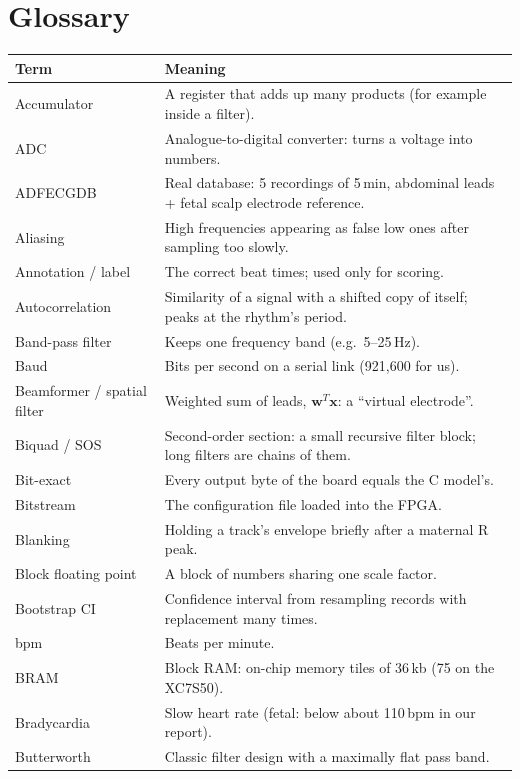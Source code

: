 \documentclass[11pt]{article}
\begin{document}
\section{Glossary}
\label{sec:glossary}
{\small
\begin{longtable}{@{}p{3.4cm} p{12.0cm}@{}}
\toprule
\textbf{Term} & \textbf{Meaning} \\
\midrule
\endhead
Accumulator & A register that adds up many products (for example inside a filter). \\
ADC & Analogue-to-digital converter: turns a voltage into numbers. \\
ADFECGDB & Real database: 5 recordings of 5\,min, abdominal leads + fetal scalp electrode reference. \\
Aliasing & High frequencies appearing as false low ones after sampling too slowly. \\
Annotation / label & The correct beat times; used only for scoring. \\
Autocorrelation & Similarity of a signal with a shifted copy of itself; peaks at the rhythm's period. \\
Band-pass filter & Keeps one frequency band (e.g.\ 5--25\,Hz). \\
Baud & Bits per second on a serial link (921,600 for us). \\
Beamformer / spatial filter & Weighted sum of leads, $\mathbf{w}^T\mathbf{x}$: a ``virtual electrode''. \\
Biquad / SOS & Second-order section: a small recursive filter block; long filters are chains of them. \\
Bit-exact & Every output byte of the board equals the C model's. \\
Bitstream & The configuration file loaded into the FPGA. \\
Blanking & Holding a track's envelope briefly after a maternal R peak. \\
Block floating point & A block of numbers sharing one scale factor. \\
Bootstrap CI & Confidence interval from resampling records with replacement many times. \\
bpm & Beats per minute. \\
BRAM & Block RAM: on-chip memory tiles of 36\,kb (75 on the XC7S50). \\
Bradycardia & Slow heart rate (fetal: below about 110\,bpm in our report). \\
Butterworth & Classic filter design with a maximally flat pass band. \\

\end{longtable}}
\end{document}

